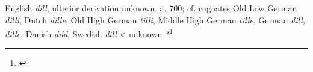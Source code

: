 \begin{etymology}\label{ety:dill}
English \textit{dill}, ulterior derivation unknown, a. 700; cf. cognates  Old Low German \textit{dilli}, Dutch \textit{dille}, Old High German \textit{tilli}, Middle High German \textit{tille}, German \textit{dill, dille}, Danish \textit{dild}, Swedish \textit{dill} 
< unknown \textit{*}\footnote{\textcite[s.v. dill]{oed}}
\end{etymology}